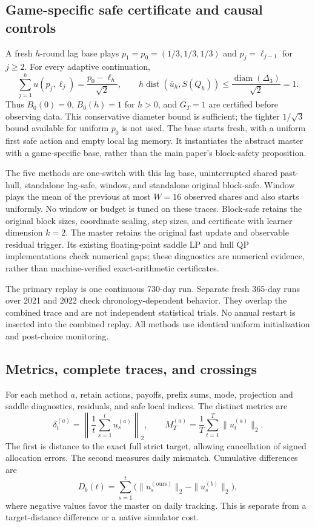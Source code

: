 \subsection{Game-specific safe certificate and causal controls}
A fresh $h$-round lag base plays $p_1=p_0=(1/3,1/3,1/3)$ and
$p_j=\ell_{j-1}$ for $j\ge2$. For every adaptive continuation,
\[
 \sum_{j=1}^h u(p_j,\ell_j)=\frac{p_0-\ell_h}{\sqrt2},\qquad
 h\operatorname{dist}(\bar u_h,S(Q_h))
 \le\frac{\operatorname{diam}(\Delta_3)}{\sqrt2}=1.
\]
Thus $B_0(0)=0$, $B_0(h)=1$ for $h>0$, and $G_T=1$ are certified before
observing data. This conservative diameter bound is sufficient; the tighter
$1/\sqrt3$ bound available for uniform $p_0$ is not used.
The base starts fresh, with a uniform first safe action and empty local lag
memory. It instantiates the abstract master with a game-specific base,
rather than the main paper's block-safety proposition.

The five methods are one-switch with this lag base, uninterrupted shared
past-hull, standalone lag-safe, window, and standalone original block-safe.
Window plays the mean of the previous at most $W=16$ observed shares and
also starts uniformly. No window or budget is tuned on these traces.
Block-safe retains the original block sizes, coordinate scaling, step sizes,
and certificate with learner dimension $k=2$. The master retains the original
fast update and observable residual trigger.
Its existing floating-point saddle LP and hull QP implementations check
numerical gaps; these diagnostics are numerical evidence, rather than
machine-verified exact-arithmetic certificates.

The primary replay is one continuous 730-day run. Separate fresh 365-day
runs over 2021 and 2022 check chronology-dependent behavior. They overlap
the combined trace and are not independent statistical trials.
No annual restart is inserted into the combined replay.
All methods use identical uniform initialization and post-choice monitoring.

\subsection{Metrics, complete traces, and crossings}
For each method $a$, retain actions, payoffs, prefix sums, mode, projection
and saddle diagnostics, residuals, and safe local indices.
The distinct metrics are
\[
 \delta_t^{(a)}=\left\|\frac1t\sum_{s=1}^t u_s^{(a)}\right\|_2,\qquad
 M_T^{(a)}=\frac1T\sum_{t=1}^T\|u_t^{(a)}\|_2.
\]
The first is distance to the exact full strict target, allowing cancellation
of signed allocation errors. The second measures daily mismatch.
Cumulative differences are
\[
 D_b(t)=\sum_{s=1}^t
 \bigl(\|u_s^{(\mathrm{ours})}\|_2-\|u_s^{(b)}\|_2\bigr),
\]
where negative values favor the master on daily tracking. This is separate
from a target-distance difference or a native simulator cost.

